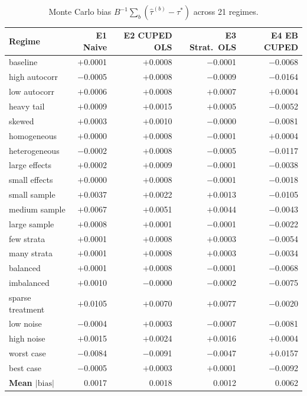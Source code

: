 \documentclass[11pt,letterpaper]{article}
\newcommand{\tauhat}{\hat{\tau}}
\newcommand{\taustar}{\tau^{*}}
\begin{document}
\begin{table}[htbp]
\centering
\caption{Monte Carlo bias $B^{-1}\sum_b (\tauhat^{(b)} - \taustar)$
across 21 regimes.}
\label{tab:bias}
\small
\begin{tabular}{@{}l rrrr@{}}
\toprule
Regime & E1 Naive & E2 CUPED OLS & E3 Strat.\ OLS & E4 EB CUPED \\
\midrule
baseline          & $+$0.0001 & $+$0.0008 & $-$0.0001 & $-$0.0068 \\
high autocorr     & $-$0.0005 & $+$0.0008 & $-$0.0009 & $-$0.0164 \\
low autocorr      & $+$0.0006 & $+$0.0008 & $+$0.0007 & $+$0.0004 \\
heavy tail        & $+$0.0009 & $+$0.0015 & $+$0.0005 & $-$0.0052 \\
skewed            & $+$0.0003 & $+$0.0010 & $-$0.0000 & $-$0.0081 \\
homogeneous       & $+$0.0000 & $+$0.0008 & $-$0.0001 & $+$0.0004 \\
heterogeneous     & $-$0.0002 & $+$0.0008 & $-$0.0005 & $-$0.0117 \\
large effects     & $+$0.0002 & $+$0.0009 & $-$0.0001 & $-$0.0038 \\
small effects     & $+$0.0000 & $+$0.0008 & $-$0.0001 & $-$0.0018 \\
small sample      & $+$0.0037 & $+$0.0022 & $+$0.0013 & $-$0.0105 \\
medium sample     & $+$0.0067 & $+$0.0051 & $+$0.0044 & $-$0.0043 \\
large sample      & $+$0.0008 & $+$0.0001 & $-$0.0001 & $-$0.0022 \\
few strata        & $+$0.0001 & $+$0.0008 & $+$0.0003 & $-$0.0054 \\
many strata       & $+$0.0001 & $+$0.0008 & $+$0.0003 & $-$0.0034 \\
balanced          & $+$0.0001 & $+$0.0008 & $-$0.0001 & $-$0.0068 \\
imbalanced        & $+$0.0010 & $-$0.0000 & $-$0.0002 & $-$0.0075 \\
sparse treatment  & $+$0.0105 & $+$0.0070 & $+$0.0077 & $-$0.0020 \\
low noise         & $-$0.0004 & $+$0.0003 & $-$0.0007 & $-$0.0081 \\
high noise        & $+$0.0015 & $+$0.0024 & $+$0.0016 & $+$0.0004 \\
worst case        & $-$0.0084 & $-$0.0091 & $-$0.0047 & $+$0.0157 \\
best case         & $-$0.0005 & $+$0.0003 & $+$0.0001 & $-$0.0092 \\
\midrule
\textbf{Mean $|\text{bias}|$} & 0.0017 & 0.0018 & 0.0012 & 0.0062 \\
\bottomrule
\end{tabular}
\end{table}
\end{document}

